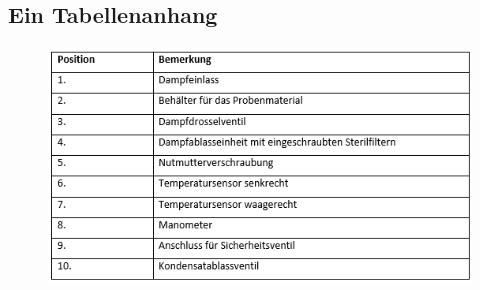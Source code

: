 \newpage
{}
\setcounter{page}{8}    %

\begin{appendix}
\clearpage{}





\chapter{Ein Tabellenanhang}
\begin{figure}[ht]
	\centering
  \includegraphics[width=\textwidth] {Anhang/tabelle1.png}
\end{figure}

\end{appendix}
